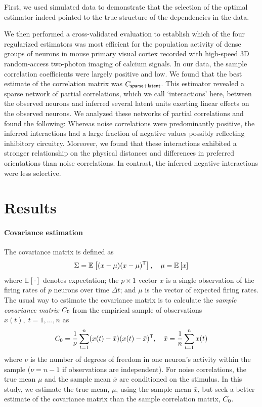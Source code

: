 \documentclass[10pt]{article}
\newcommand{\sq}[1]{\lq#1\rq}
\newcommand{\T}{{\sf T}}
\newcommand{\E}[2][]{\mathbb E_{#1}\left[ #2\right]}    %
\begin{document}
First, we used simulated data to demonstrate that the selection of the optimal estimator indeed pointed to the true structure of the dependencies in the data. 

We then performed a cross-validated evaluation to establish which of the four regularized estimators was most efficient for the population activity of dense groups of neurons in mouse primary visual cortex recorded with high-speed 3D random-access two-photon imaging of calcium signals. In our data, the sample correlation coefficients were largely positive and low.  We found that the best estimate of the correlation matrix was $C_{\sf sparse+latent}$.  This estimator revealed a sparse network of partial correlations, which we call \sq{interactions} here, between the observed neurons and inferred several latent units exerting linear effects on the observed neurons. We analyzed these networks of partial correlations and found the following: Whereas noise correlations were predominantly positive, the inferred interactions had a large fraction of negative values possibly reflecting inhibitory circuitry.  Moreover, we found that these interactions exhibited a stronger relationship on the physical distances and differences in preferred orientations than noise correlations. In contrast, the inferred negative interactions were less selective. 


\section*{Results}
\paragraph{Covariance estimation}
The covariance matrix is defined as
\begin{equation}\label{eq:true-covariance}
    \Sigma = \E{(x-\mu)(x-\mu)^\T},\quad \mu = \E{x}
\end{equation}
where $\E{\cdot}$ denotes expectation; the $p\times 1$ vector $x$ is a single observation of the firing rates of $p$ neurons over time $\Delta t$; and $\mu$ is the vector of expected firing rates.  The usual way to estimate the covariance matrix is to calculate the \emph{sample covariance matrix} $C_{\sf 0}$ from the empirical sample of observations $x(t),\; t=1,\ldots,n$ as
\begin{equation}\label{eq:sample}
    C_{\sf 0} = \frac 1 \nu \sum\limits_{t=1}^n (x(t)-\bar x)(x(t)-\bar x)^\T,\quad \bar x= \frac 1 n \sum\limits_{t=1}^n x(t)
\end{equation}
where $\nu$ is the number of degrees of freedom in one neuron's activity within the sample ($\nu=n-1$ if observations are independent). For noise correlations, the true mean $\mu$ and the sample mean $\bar x$ are conditioned on the stimulus. In this study, we estimate the true mean, $\mu$, using the sample mean $\bar x$, but seek a better estimate of the covariance matrix than the sample correlation matrix, $C_{\sf 0}$.  
\end{document}

